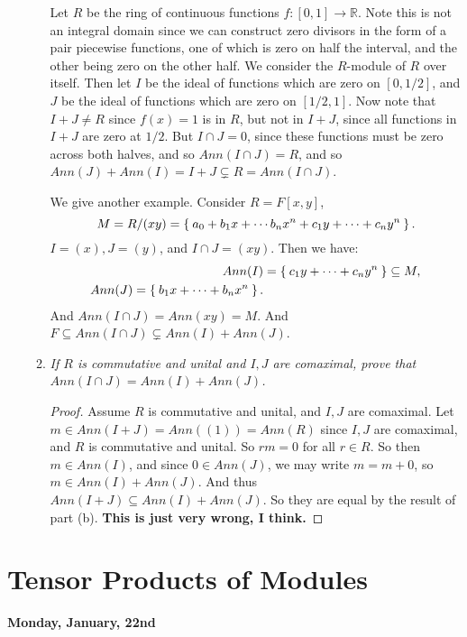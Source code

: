 \documentclass[12pt]{amsbook}
\theoremstyle{plain}
\numberwithin{section}{chapter}
\numberwithin{equation}{chapter}
\theoremstyle{definition}
\theoremstyle{remark}
\newcommand{\sub}{\subseteq}
\newcommand{\R}{\mathbb{R}}
\newcommand{\bee}{\begin{equation}\begin{aligned}}
\newcommand{\eee}{\end{aligned}\end{equation}}
\begin{document}
\begin{enumerate}[label=\arabic*.]
\begin{enumerate}
 Let $R$ be the ring of continuous functions $f:[0,1] \to \R$. Note this is not an integral domain since we can construct zero divisors in the form of a pair piecewise functions, one of which is zero on half the interval, and the other being zero on the other half. We consider the $R$-module of $R$ over itself. Then let $I$ be the ideal of functions which are zero on $[0,1/2]$, and $J$ be the ideal of functions which are zero on $[1/2,1]$. Now note that $I + J \neq R$ since $f(x) = 1$ is in $R$, but not in $I + J$, since all functions in $I + J$ are zero at $1/2$. But $I \cap J = 0$, since these functions must be zero across both halves, and so $Ann(I \cap J) = R$, and so $Ann(J) + Ann(I) = I + J \subsetneq R = Ann(I \cap J)$. 
 
 We give another example. Consider $R = F[x,y]$, 
 $$
 M = R/(xy) = \Set{a_0 + b_1x + \cdots b_nx^n + c_1y + \cdots + c_ny^n}.
 $$ 
 $I = (x),J = (y)$, and $I \cap J = (xy)$. Then we have: 
\bee
Ann(I) &= \Set{c_1y + \cdots + c_ny^n} \sub M,\\
Ann(J) = \Set{b_1x + \cdots + b_nx^n}.
\eee
And $Ann(I \cap J) = Ann(xy) = M$. And $F \sub Ann(I \cap J) \subsetneq Ann(I) + Ann(J)$. 
 
 \item \textit{If $R$ is commutative and unital and $I,J$ are comaximal, prove that $Ann(I \cap J) = Ann(I) + Ann(J)$. }
 
 \begin{proof}
 Assume $R$ is commutative and unital, and $I,J$ are comaximal. 
 Let $m \in Ann(I + J) = Ann((1)) = Ann(R)$ since $I,J$ are comaximal, and $R$ is commutative and unital. So $rm = 0$ for all $r \in R$. So then $m \in Ann(I)$, and since $0 \in Ann(J)$, we may write $m = m + 0$, so $m \in Ann(I) + Ann(J)$. And thus $Ann(I + J) \sub Ann(I) + Ann(J)$. So they are equal by the result of part (b). \textbf{This is just very wrong, I think. }
 \end{proof}
\end{enumerate}  

\end{enumerate}

\section{Tensor Products of Modules}

\textbf{Monday, January, 22nd}
\end{document}
